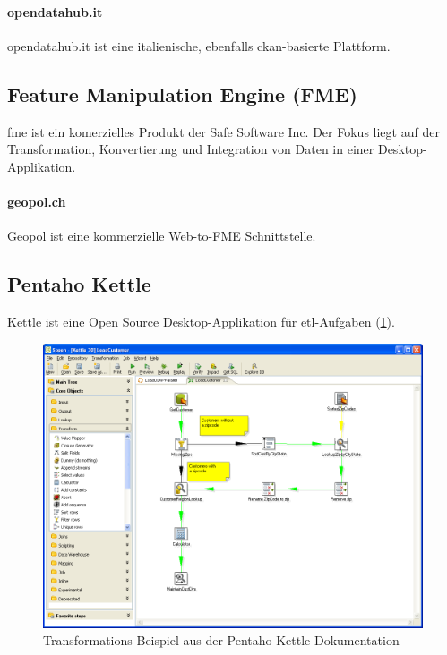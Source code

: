\paragraph{opendatahub.it}
opendatahub.it ist eine italienische, ebenfalls \gls{ckan}-basierte Plattform.

\subsection{Feature Manipulation Engine (FME)}
\gls{fme} ist ein komerzielles Produkt der Safe Software Inc. Der Fokus liegt auf der Transformation, Konvertierung und Integration von Daten in einer Desktop-Applikation.

\paragraph{geopol.ch}
Geopol ist eine kommerzielle Web-to-FME Schnittstelle.

\subsection{Pentaho Kettle}
Kettle ist eine Open Source Desktop-Applikation für \acs{etl}-Aufgaben (\cref{fig:tb:kettle}).

\begin{figure}[H]
    \centering
    \includegraphics[width=2\linewidth/3]{fig/kettle-spoon-transformation}
    \caption{Transformations-Beispiel aus der Pentaho Kettle-Dokumentation}
    \label{fig:tb:kettle}
\end{figure}

